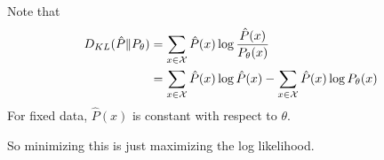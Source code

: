 \begin{answer}
    Note that
    $$
    \begin{aligned}
        D_{KL}(\hat P\|P_\theta) &=  \sum_{x\in\cal X} \hat P(x)\log \frac{\hat P(x)}{P_\theta(x)}\\
        &= \sum_{x\in\cal X}\hat P(x)\log\hat P(x) - \sum_{x\in\cal X}\hat P(x)\log P_\theta(x)\\
    \end{aligned}
    $$
    For fixed data, $ \hat{P}(x) $ is constant with respect to $ \theta $.

    So minimizing this is just maximizing the log likelihood. 
\end{answer}
